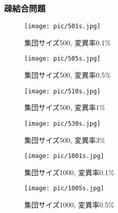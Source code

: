 \documentclass[a4j]{jarticle}
\begin{document}
\subsubsection*{疎結合問題}
\begin{figure}[htb]
 \begin{minipage}{0.5\hsize}
  \begin{center}
  \texttt{[image: pic/501s.jpg]}
  \end{center}
  \caption{集団サイズ500, 変異率0.1\%}
  \label{501s}
 \end{minipage}
 \begin{minipage}{0.5\hsize}
  \begin{center}
  \texttt{[image: pic/505s.jpg]}
  \end{center}
  \caption{集団サイズ500, 変異率0.5\%}
  \label{505s}
 \end{minipage}
\end{figure}

\begin{figure}[htb]
 \begin{minipage}{0.5\hsize}
  \begin{center}
  \texttt{[image: pic/510s.jpg]}
  \end{center}
  \caption{集団サイズ500, 変異率1\%}
  \label{510s}
 \end{minipage}
 \begin{minipage}{0.5\hsize}
  \begin{center}
  \texttt{[image: pic/530s.jpg]}
  \end{center}
  \caption{集団サイズ500, 変異率3\%}
  \label{530s}
 \end{minipage}
\end{figure}

\begin{figure}[htb]
 \begin{minipage}{0.5\hsize}
  \begin{center}
  \texttt{[image: pic/1001s.jpg]}
  \end{center}
  \caption{集団サイズ1000, 変異率0.1\%}
  \label{1001s}
 \end{minipage}
 \begin{minipage}{0.5\hsize}
  \begin{center}
  \texttt{[image: pic/1005s.jpg]}
  \end{center}
  \caption{集団サイズ1000, 変異率0.5\%}
  \label{1005s}
 \end{minipage}
\end{figure}
\end{document}
